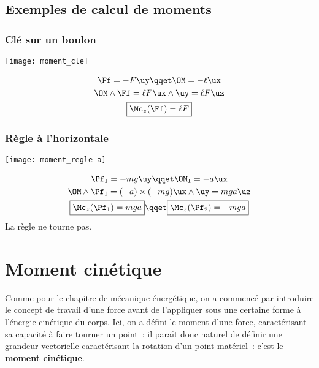 \documentclass[../main/main.tex]{subfiles}
\begin{document}
\subsection{Exemples de calcul de moments}

\subsubsection{Clé sur un boulon}
\begin{minipage}[c]{0.25\linewidth}
    \begin{center}
        \texttt{[image: moment\_cle]}
    \end{center}
\end{minipage}
\hfill
\begin{minipage}{0.70\linewidth}
    \begin{gather*}
        \Ff = -F\uy
        \qqet
        \OM = -\ell\ux
        \\
        \OM\wedge\Ff = \ell F\ux\wedge\uy = \ell F \uz
        \\
        \boxed{\Mc_z(\Ff) = \ell F}
    \end{gather*}
\end{minipage}

\subsubsection{Règle à l'horizontale}
\begin{minipage}[c]{0.25\linewidth}
    \begin{center}
        \texttt{[image: moment\_regle-a]}
    \end{center}
\end{minipage}
\hfill
\begin{minipage}{0.65\linewidth}
    \begin{gather*}
        \Pf_1 = -mg\uy
        \qqet
        \OM_1 = -a\ux
        \\
        \OM\wedge\Pf_1 = (-a)\times(-mg)\ux\wedge\uy = mga\uz
        \\
        \boxed{\Mc_z(\Pf_1) = mga}
        \qqet
        \boxed{\Mc_z(\Pf_2) = -mga}
    \end{gather*}
    \centering La règle ne tourne pas.
\end{minipage}

\section{Moment cinétique}
Comme pour le chapitre de mécanique énergétique, on a commencé par introduire le
concept de travail d'une force avant de l'appliquer sous une certaine forme à
l'énergie cinétique du corps. Ici, on a défini le moment d'une force,
caractérisant sa capacité à faire tourner un point~: il paraît donc naturel de
définir une grandeur vectorielle caractérisant la rotation d'un point matériel~:
c'est le \textbf{moment cinétique}.
\end{document}
